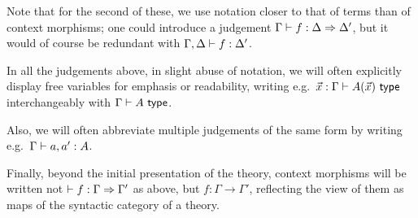 Note that for the second of these, we use notation closer to that of terms than of context morphisms; one could introduce a judgement $\Gamma \vdash f : \Delta \Rightarrow \Delta'$, but it would of course be redundant with $\Gamma, \Delta \vdash f : \Delta'$.

In all the judgements above, in slight abuse of notation, we will often explicitly display free variables for emphasis or readability, writing e.g.\ $\x : \Gamma \types A(\x)\ \type$ interchangeably with $\Gamma \vdash A\ \mathsf{type}$.

Also, we will often abbreviate multiple judgements of the same form by writing e.g.\ $\Gamma \vdash a,a' : A$.

Finally, beyond the initial presentation of the theory, context morphisms will be written not $\vdash f : \Gamma \Rightarrow \Gamma'$ as above, but $f \colon \Gamma \to \Gamma'$, reflecting the view of them as maps of the syntactic category of a theory.


